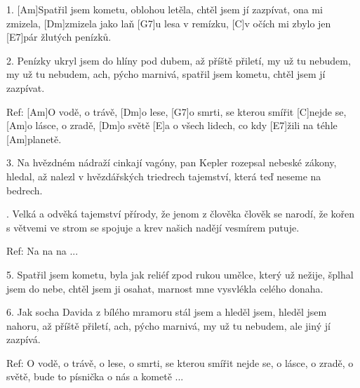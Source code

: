 
1. [Am]Spatřil jsem kometu, oblohou letěla,
chtěl jsem jí zazpívat, ona mi zmizela,
[Dm]zmizela jako laň [G7]u lesa v remízku,
[C]v očích mi zbylo jen [E7]pár žlutých penízků.

2. Penízky ukryl jsem do hlíny pod dubem,
až příště přiletí, my už tu nebudem,
my už tu nebudem, ach, pýcho marnivá,
spatřil jsem kometu, chtěl jsem jí zazpívat.

Ref: [Am]O vodě, o trávě, [Dm]o lese,
[G7]o smrti, se kterou smířit [C]nejde se,
[Am]o lásce, o zradě, [Dm]o světě 
[E]a o všech lidech, co kdy [E7]\null žili na téhle [Am]planetě.

3. Na hvězdném nádraží cinkají vagóny,
pan Kepler rozepsal nebeské zákony,
hledal, až nalezl v hvězdářských triedrech
tajemství, která teď neseme na bedrech.

. Velká a odvěká tajemství přírody,
že jenom z člověka člověk se narodí,
že kořen s větvemi ve strom se spojuje
a krev našich nadějí vesmírem putuje.

Ref: Na na na ...

5. Spatřil jsem kometu, byla jak reliéf
zpod rukou umělce, který už nežije,
šplhal jsem do nebe, chtěl jsem ji osahat,
marnost mne vysvlékla celého donaha.

6. Jak socha Davida z bílého mramoru
stál jsem a hleděl jsem, hleděl jsem nahoru,
až příště přiletí, ach, pýcho marnivá,
my už tu nebudem, ale jiný jí zazpívá.

Ref: O vodě, o trávě, o lese,
o smrti, se kterou smířit nejde se,
o lásce, o zradě, o světě,
bude to písnička o nás a kometě ...
